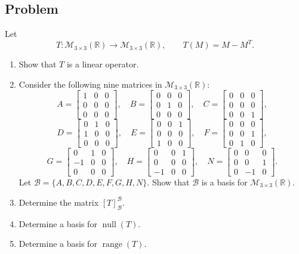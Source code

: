 \documentclass[12pt]{article}
\newcommand{\R}{\mathbb{R}}
\newcommand{\M}{\mathcal{M}}
\newcommand{\B}{\mathcal{B}}
\newcommand{\Null}{\operatorname{null}}
\newcommand{\Range}{\operatorname{range}}
\begin{document}
\subsection{Problem}
Let
\[
T:\M_{3\times3}(\R)\to\M_{3\times3}(\R),
\qquad
T(M)=M-M^T.
\]
\begin{enumerate}[label=(\alph*)]
  \item Show that $T$ is a linear operator.
  \item Consider the following nine matrices in $\M_{3\times3}(\R)$:
  \[
  A=\begin{bmatrix}1&0&0\\0&0&0\\0&0&0\end{bmatrix},
  \quad
  B=\begin{bmatrix}0&0&0\\0&1&0\\0&0&0\end{bmatrix},
  \quad
  C=\begin{bmatrix}0&0&0\\0&0&0\\0&0&1\end{bmatrix},
  \]
  \[
  D=\begin{bmatrix}0&1&0\\1&0&0\\0&0&0\end{bmatrix},
  \quad
  E=\begin{bmatrix}0&0&1\\0&0&0\\1&0&0\end{bmatrix},
  \quad
  F=\begin{bmatrix}0&0&0\\0&0&1\\0&1&0\end{bmatrix},
  \]
  \[
  G=\begin{bmatrix}0&1&0\\-1&0&0\\0&0&0\end{bmatrix},
  \quad
  H=\begin{bmatrix}0&0&1\\0&0&0\\-1&0&0\end{bmatrix},
  \quad
  N=\begin{bmatrix}0&0&0\\0&0&1\\0&-1&0\end{bmatrix}.
  \]
  Let $\B=\{A,B,C,D,E,F,G,H,N\}$. Show that $\B$ is a basis for $\M_{3\times3}(\R)$.
  \item Determine the matrix $[T]_{\B}^{\B}$.
  \item Determine a basis for $\Null(T)$.
  \item Determine a basis for $\Range(T)$.
\end{enumerate}
\end{document}
